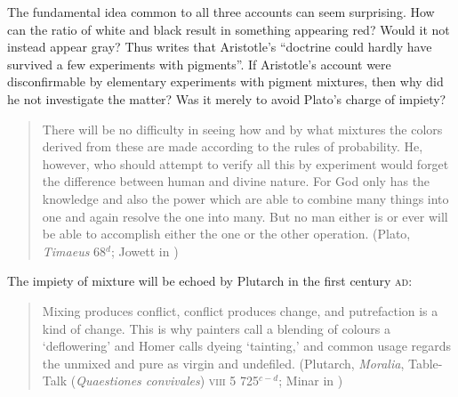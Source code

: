 The fundamental idea common to all three accounts can seem surprising. How can the ratio of white and black result in something appearing red? Would it not instead appear gray? Thus \citet[210]{Hett:1936fk} writes that Aristotle's ``doctrine could hardly have survived a few experiments with pigments''. If Aristotle's account were disconfirmable by elementary experiments with pigment mixtures, then why did he not investigate the matter? Was it merely to avoid Plato's charge of impiety?
\begin{quote}
    There will be no difficulty in seeing how and by what mixtures the colors derived from these are made according to the rules of probability. He, however, who should attempt to verify all this by experiment would forget the difference between human and divine nature. For God only has the knowledge and also the power which are able to combine many things into one and again resolve the one into many. But no man either is or ever will be able to accomplish either the one or the other operation. (Plato, \emph{Timaeus} 68\( ^{d} \); Jowett in \citealt[1192]{Hamilton:1989fk})
\end{quote}
The impiety of mixture will be echoed by Plutarch in the first century \textsc{ad}:
\begin{quote}
	Mixing produces conflict, conflict produces change, and putrefaction is a kind of change. This is why painters call a blending of colours a `deflowering' and Homer calls dyeing `tainting,' and common usage regards the unmixed and pure as virgin and undefiled. (Plutarch, \emph{Moralia}, Table-Talk (\emph{Quaestiones convivales}) \textsc{viii} 5 725\( ^{c-d} \); Minar in \citealt[155--157]{Milnar:1961aa})
\end{quote}

